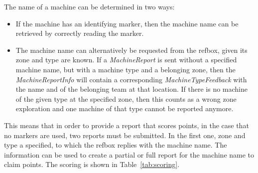 \documentclass[12pt,twoside]{article}
\newcommand{\reftab}[1]{Table~\ref{#1}}
\begin{document}
The name of a machine can be determined in two ways:
\begin{itemize}
  \item If the machine has an identifying marker, then the machine name can be
    retrieved by correctly reading the marker.
  \item The machine name can alternatively be requested from the \ac{refbox},
   given its zone and type are known.
   If a \textit{MachineReport} is sent without a specified machine name, but
   with a machine type and a belonging zone, then the \textit{MachineReportInfo}
   will contain a corresponding \textit{MachineTypeFeedback} with the name
   and of the belonging team at that location.
   If there is no machine of the given type at the specified zone, then this
   counts as a wrong zone exploration and one machine of that type cannot be
   reported anymore.
\end{itemize}
This means that in order to provide a report that scores points, in the
case that no markers are used, two reports must be submitted. In the first
one, zone and type a specified, to which the \ac{refbox} replies with the
machine name. The information can be used to create a partial or
full report for the machine name to claim points.
The scoring is shown in \reftab{tab:scoring}.
\end{document}
